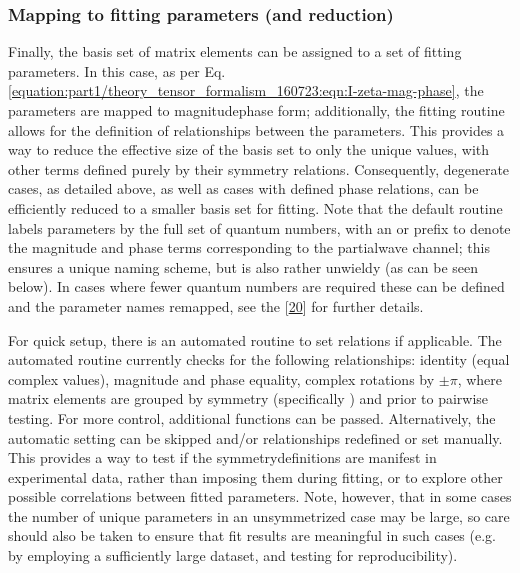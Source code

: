 \documentclass[letterpaper,table,10pt,english]{jupyterBook}
\begin{document}
\subsubsection{Mapping to fitting parameters (and reduction)}
\label{\detokenize{part2/sym-fitting-intro_240723:mapping-to-fitting-parameters-and-reduction}}\label{\detokenize{part2/sym-fitting-intro_240723:sec-basis-sets-remapping-to-fittingparams}}
\sphinxAtStartPar
Finally, the basis set of matrix elements can be assigned to a set of fitting parameters. In this case, as per Eq. \eqref{equation:part1/theory_tensor_formalism_160723:eqn:I-zeta-mag-phase}, the parameters are mapped to magnitude\sphinxhyphen{}phase form; additionally, the fitting routine allows for the definition of relationships between the parameters. This provides a way to reduce the effective size of the basis set to only the unique values, with other terms defined purely by their symmetry relations. Consequently, degenerate cases, as detailed above, as well as cases with defined phase relations, can be efficiently reduced to a smaller basis set for fitting. Note that the default routine labels parameters by the full set of quantum numbers, with an  or  prefix to denote the magnitude and phase terms corresponding to the partial\sphinxhyphen{}wave channel; this ensures a unique naming scheme, but is also rather unwieldy (as can be seen below). In cases where fewer quantum numbers are required these can be defined and the parameter names remapped, see the  {[}\hyperlink{cite.backmatter/bibliography:id681}{20}{]} for further details.

\sphinxAtStartPar
For quick setup, there is an automated routine to set relations if applicable. The automated routine currently checks for the following relationships: identity (equal complex values), magnitude and phase equality, complex rotations by \(\pm\pi\), where matrix elements are grouped by symmetry (specifically ) and  prior to pair\sphinxhyphen{}wise testing. For more control, additional functions can be passed. Alternatively, the automatic setting can be skipped and/or relationships redefined or set manually. This provides a way to test if the symmetry\sphinxhyphen{}definitions are manifest in experimental data, rather than imposing them during fitting, or to explore other possible correlations between fitted parameters. Note, however, that in some cases the number of unique parameters in an unsymmetrized case may be large, so care should also be taken to ensure that fit results are meaningful in such cases (e.g. by employing a sufficiently large dataset, and testing for reproducibility).
\end{document}
